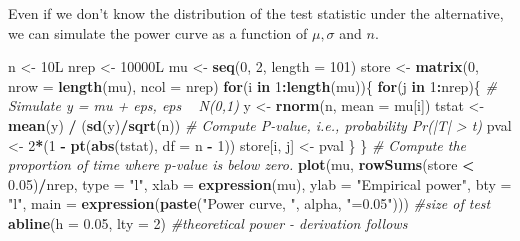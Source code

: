 \documentclass[]{book}
\newenvironment{Shaded}{\begin{snugshade}}{\end{snugshade}}
\newcommand{\CommentTok}[1]{\textcolor[rgb]{0.56,0.35,0.01}{\textit{#1}}}
\newcommand{\ControlFlowTok}[1]{\textcolor[rgb]{0.13,0.29,0.53}{\textbf{#1}}}
\newcommand{\DataTypeTok}[1]{\textcolor[rgb]{0.13,0.29,0.53}{#1}}
\newcommand{\DecValTok}[1]{\textcolor[rgb]{0.00,0.00,0.81}{#1}}
\newcommand{\FloatTok}[1]{\textcolor[rgb]{0.00,0.00,0.81}{#1}}
\newcommand{\KeywordTok}[1]{\textcolor[rgb]{0.13,0.29,0.53}{\textbf{#1}}}
\newcommand{\NormalTok}[1]{#1}
\newcommand{\OperatorTok}[1]{\textcolor[rgb]{0.81,0.36,0.00}{\textbf{#1}}}
\newcommand{\StringTok}[1]{\textcolor[rgb]{0.31,0.60,0.02}{#1}}
\theoremstyle{definition}
\theoremstyle{definition}
\theoremstyle{definition}
\theoremstyle{remark}
\begin{document}
Even if we don't know the distribution of the test statistic under the alternative, we can simulate the power curve as a function of \(\mu, \sigma\) and \(n\).

\begin{Shaded}
\begin{Highlighting}[]
\NormalTok{n <-}\StringTok{ }\NormalTok{10L}
\NormalTok{nrep <-}\StringTok{ }\NormalTok{10000L}
\NormalTok{mu <-}\StringTok{ }\KeywordTok{seq}\NormalTok{(}\DecValTok{0}\NormalTok{, }\DecValTok{2}\NormalTok{, }\DataTypeTok{length =} \DecValTok{101}\NormalTok{)}
\NormalTok{store <-}\StringTok{ }\KeywordTok{matrix}\NormalTok{(}\DecValTok{0}\NormalTok{, }\DataTypeTok{nrow =} \KeywordTok{length}\NormalTok{(mu), }\DataTypeTok{ncol =}\NormalTok{ nrep)}
\ControlFlowTok{for}\NormalTok{(i }\ControlFlowTok{in} \DecValTok{1}\OperatorTok{:}\KeywordTok{length}\NormalTok{(mu))\{}
  \ControlFlowTok{for}\NormalTok{(j }\ControlFlowTok{in} \DecValTok{1}\OperatorTok{:}\NormalTok{nrep)\{}
    \CommentTok{# Simulate y = mu + eps, eps ~ N(0,1)}
\NormalTok{    y <-}\StringTok{ }\KeywordTok{rnorm}\NormalTok{(n, }\DataTypeTok{mean =}\NormalTok{ mu[i])}
\NormalTok{    tstat <-}\StringTok{ }\KeywordTok{mean}\NormalTok{(y) }\OperatorTok{/}\StringTok{ }\NormalTok{(}\KeywordTok{sd}\NormalTok{(y)}\OperatorTok{/}\KeywordTok{sqrt}\NormalTok{(n))}
    \CommentTok{# Compute P-value, i.e., probability Pr(|T| > t)}
\NormalTok{    pval <-}\StringTok{ }\DecValTok{2}\OperatorTok{*}\NormalTok{(}\DecValTok{1} \OperatorTok{-}\StringTok{ }\KeywordTok{pt}\NormalTok{(}\KeywordTok{abs}\NormalTok{(tstat), }\DataTypeTok{df =}\NormalTok{ n }\OperatorTok{-}\StringTok{ }\DecValTok{1}\NormalTok{))}
\NormalTok{    store[i, j] <-}\StringTok{ }\NormalTok{pval}
\NormalTok{  \}}
\NormalTok{\}}
\CommentTok{# Compute the proportion of time where p-value is below zero.}
\KeywordTok{plot}\NormalTok{(mu, }\KeywordTok{rowSums}\NormalTok{(store }\OperatorTok{<}\StringTok{ }\FloatTok{0.05}\NormalTok{)}\OperatorTok{/}\NormalTok{nrep,}
     \DataTypeTok{type =} \StringTok{"l"}\NormalTok{, }\DataTypeTok{xlab =} \KeywordTok{expression}\NormalTok{(mu), }
     \DataTypeTok{ylab =} \StringTok{"Empirical power"}\NormalTok{, }\DataTypeTok{bty =} \StringTok{"l"}\NormalTok{,}
     \DataTypeTok{main =} \KeywordTok{expression}\NormalTok{(}\KeywordTok{paste}\NormalTok{(}\StringTok{"Power curve, "}\NormalTok{, alpha, }\StringTok{"=0.05"}\NormalTok{)))}
\CommentTok{#size of test}
\KeywordTok{abline}\NormalTok{(}\DataTypeTok{h =} \FloatTok{0.05}\NormalTok{, }\DataTypeTok{lty =} \DecValTok{2}\NormalTok{)}
\CommentTok{#theoretical power - derivation follows }

\end{Highlighting}
\end{Shaded}
\end{document}
